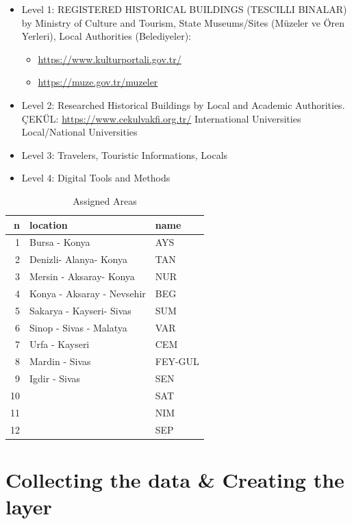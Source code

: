 \documentclass[
]{book}
\providecommand{\tightlist}{%
  \setlength{\itemsep}{0pt}\setlength{\parskip}{0pt}}
\begin{document}
\begin{itemize}
\item
  Level 1: REGISTERED HISTORICAL BUILDINGS (TESCILLI BINALAR) by Ministry of Culture and Tourism, State Museums/Sites (Müzeler ve Ören Yerleri), Local Authorities (Belediyeler):

  \begin{itemize}
  \tightlist
  \item
    \url{https://www.kulturportali.gov.tr/}
  \item
    \url{https://muze.gov.tr/muzeler}
  \end{itemize}
\item
  Level 2: Researched Historical Buildings by Local and Academic Authorities.
  ÇEKÜL: \url{https://www.cekulvakfi.org.tr/}
  International Universities
  Local/National Universities
\item
  Level 3: Travelers, Touristic Informations, Locals
\item
  Level 4: Digital Tools and Methods
\end{itemize}

\begin{table}

\caption{\label{tab:unnamed-chunk-2}Assigned Areas}
\centering
\begin{tabular}[t]{r|l|l}
\hline
n & location & name\\
\hline
1 & Bursa - Konya & AYS\\
\hline
2 & Denizli- Alanya- Konya & TAN\\
\hline
3 & Mersin - Aksaray- Konya & NUR\\
\hline
4 & Konya - Aksaray - Nevsehir & BEG\\
\hline
5 & Sakarya - Kayseri- Sivas & SUM\\
\hline
6 & Sinop - Sivas - Malatya & VAR\\
\hline
7 & Urfa - Kayseri & CEM\\
\hline
8 & Mardin - Sivas & FEY-GUL\\
\hline
9 & Igdir - Sivas & SEN\\
\hline
10 &  & SAT\\
\hline
11 &  & NIM\\
\hline
12 &  & SEP\\
\hline
\end{tabular}
\end{table}

\hypertarget{collecting-the-data-creating-the-layer}{%
\section{Collecting the data \& Creating the layer}\label{collecting-the-data-creating-the-layer}}
\end{document}

